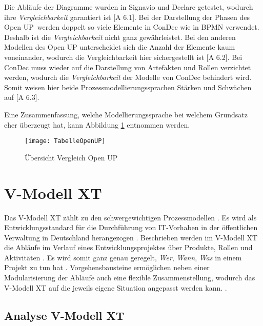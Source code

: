 Die Abläufe der Diagramme wurden in Signavio und Declare getestet, wodurch ihre \textit{Vergleichbarkeit} garantiert ist [A 6.1].\newline
Bei der Darstellung der \grqq Phasen des Open UP\grqq \ werden doppelt so viele Elemente in ConDec wie in BPMN verwendet. Deshalb ist die \textit{Vergleichbarkeit} nicht ganz gewährleistet. Bei den anderen Modellen des Open UP unterscheidet sich die Anzahl der Elemente kaum voneinander, wodurch die Vergleichbarkeit hier sichergestellt ist [A 6.2]. \newline
Bei ConDec muss wieder auf die Darstellung von Artefakten und Rollen verzichtet werden, wodurch die \textit{Vergleichbarkeit} der Modelle von ConDec behindert wird. Somit weisen hier beide Prozessmodellierungssprachen Stärken und Schwächen auf [A 6.3].\newline

Eine Zusammenfassung, welche Modellierungssprache bei welchem Grundsatz eher überzeugt hat, kann Abbildung \ref{fig:TabelleOpenUP} entnommen werden. \newline


\begin{figure}[htp]
\begin{center}
  \texttt{[image: TabelleOpenUP]} %
  \caption{Übersicht Vergleich Open UP}
  \label{fig:TabelleOpenUP}
\end{center}
\end{figure}


\section{V-Modell XT}


Das V-Modell XT zählt zu den schwergewichtigen Prozessmodellen \cite{Hanser2010}. Es wird als Entwicklungsstandard für die Durchführung von IT-Vorhaben in der öffentlichen Verwaltung in Deutschland herangezogen \cite{Kuhrmann2011}. Beschrieben werden im V-Modell XT die Abläufe im Verlauf eines Entwicklungsprojektes über Produkte, Rollen und Aktivitäten \cite{Friedrich2008}. Es wird somit ganz genau geregelt, \textit{Wer}, \textit{Wann}, \textit{Was} in einem Projekt zu tun hat \cite{2004vmodell}. Vorgehensbausteine ermöglichen neben einer Modularisierung der Abläufe auch eine flexible Zusammenstellung, wodurch das V-Modell XT auf die jeweils eigene Situation angepasst werden kann. \cite{Friedrich2008,Zoerner2012}. \newline

\subsection{Analyse V-Modell XT}

